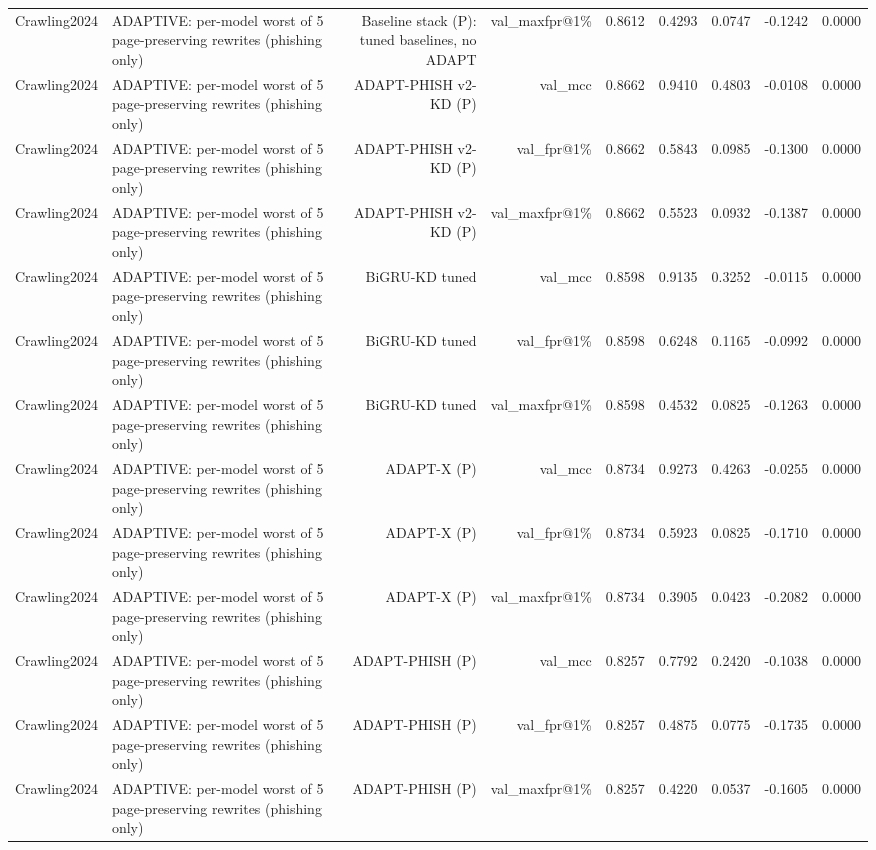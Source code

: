 \begin{table}[t]
\begin{tabular}{llrrrrrrr}
Crawling2024 & ADAPTIVE: per-model worst of 5 page-preserving rewrites (phishing only) & Baseline stack (P): tuned baselines, no ADAPT & val\_maxfpr@1\% & 0.8612 & 0.4293 & 0.0747 & -0.1242 & 0.0000 \\
Crawling2024 & ADAPTIVE: per-model worst of 5 page-preserving rewrites (phishing only) & ADAPT-PHISH v2-KD (P) & val\_mcc & 0.8662 & 0.9410 & 0.4803 & -0.0108 & 0.0000 \\
Crawling2024 & ADAPTIVE: per-model worst of 5 page-preserving rewrites (phishing only) & ADAPT-PHISH v2-KD (P) & val\_fpr@1\% & 0.8662 & 0.5843 & 0.0985 & -0.1300 & 0.0000 \\
Crawling2024 & ADAPTIVE: per-model worst of 5 page-preserving rewrites (phishing only) & ADAPT-PHISH v2-KD (P) & val\_maxfpr@1\% & 0.8662 & 0.5523 & 0.0932 & -0.1387 & 0.0000 \\
Crawling2024 & ADAPTIVE: per-model worst of 5 page-preserving rewrites (phishing only) & BiGRU-KD tuned & val\_mcc & 0.8598 & 0.9135 & 0.3252 & -0.0115 & 0.0000 \\
Crawling2024 & ADAPTIVE: per-model worst of 5 page-preserving rewrites (phishing only) & BiGRU-KD tuned & val\_fpr@1\% & 0.8598 & 0.6248 & 0.1165 & -0.0992 & 0.0000 \\
Crawling2024 & ADAPTIVE: per-model worst of 5 page-preserving rewrites (phishing only) & BiGRU-KD tuned & val\_maxfpr@1\% & 0.8598 & 0.4532 & 0.0825 & -0.1263 & 0.0000 \\
Crawling2024 & ADAPTIVE: per-model worst of 5 page-preserving rewrites (phishing only) & ADAPT-X (P) & val\_mcc & 0.8734 & 0.9273 & 0.4263 & -0.0255 & 0.0000 \\
Crawling2024 & ADAPTIVE: per-model worst of 5 page-preserving rewrites (phishing only) & ADAPT-X (P) & val\_fpr@1\% & 0.8734 & 0.5923 & 0.0825 & -0.1710 & 0.0000 \\
Crawling2024 & ADAPTIVE: per-model worst of 5 page-preserving rewrites (phishing only) & ADAPT-X (P) & val\_maxfpr@1\% & 0.8734 & 0.3905 & 0.0423 & -0.2082 & 0.0000 \\
Crawling2024 & ADAPTIVE: per-model worst of 5 page-preserving rewrites (phishing only) & ADAPT-PHISH (P) & val\_mcc & 0.8257 & 0.7792 & 0.2420 & -0.1038 & 0.0000 \\
Crawling2024 & ADAPTIVE: per-model worst of 5 page-preserving rewrites (phishing only) & ADAPT-PHISH (P) & val\_fpr@1\% & 0.8257 & 0.4875 & 0.0775 & -0.1735 & 0.0000 \\
Crawling2024 & ADAPTIVE: per-model worst of 5 page-preserving rewrites (phishing only) & ADAPT-PHISH (P) & val\_maxfpr@1\% & 0.8257 & 0.4220 & 0.0537 & -0.1605 & 0.0000 \\

\end{tabular}
\end{table}
